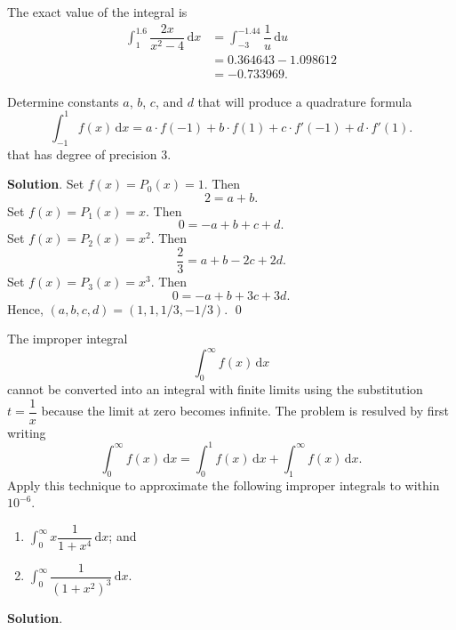 \documentclass[11pt]{article}
\theoremstyle{break}
\newcommand{\ddi}{\text{$\,$d}}
\numberwithin{equation}{theorem}
\begin{document}
The exact value of the integral is \begin{align*}
    \int_{1}^{1.6}\dfrac{2x}{x^2-4}\ddi x&=\int_{-3}^{-1.44}\dfrac{1}{u}\ddi u\\
    &=0.364643-1.098612\\
    &=-0.733969.
\end{align*}


\newpage
\begin{problem}\label{problem 15} %
    Determine constants $a$, $b$, $c$, and $d$ that will produce a quadrature formula $$\int_{-1}^{1}f(x)\ddi x=a\cdot f(-1)+b\cdot f(1)+c\cdot f'(-1)+d\cdot f'(1).$$ that has degree of precision $3$.
\end{problem}
\textbf{Solution}. Set $f(x)=P_0(x)=1$. Then $$2=a+b.$$ Set $f(x)=P_1(x)=x$. Then $$0=-a+b+c+d.$$ Set $f(x)=P_2(x)=x^2$. Then $$\dfrac{2}{3}=a+b-2c+2d.$$ Set $f(x)=P_3(x)=x^3$. Then $$0=-a+b+3c+3d.$$ Hence, $(a, b, c, d)=(1, 1, 1/3, -1/3)$. \qed


\newpage
\begin{problem}\label{problem 16} %
    The improper integral $$\int_{0}^{\infty}f(x)\ddi x$$ cannot be converted into an integral with finite limits using the substitution $t=\dfrac{1}{x}$ because the limit at zero becomes infinite. The problem is resulved by first writing $$\int_{0}^{\infty}f(x)\ddi x=\int_{0}^{1}f(x)\ddi x+\int_{1}^{\infty}f(x)\ddi x.$$ Apply this technique to approximate the following improper integrals to within $10^{-6}$. \vspace{-1em}
    \begin{multicols}{2}
        \begin{enumerate}
            \item $\displaystyle\int_{0}^{\infty}x\dfrac{1}{1+x^4}\ddi x$; and
            \item $\displaystyle\int_{0}^{\infty}\dfrac{1}{(1+x^2)^3}\ddi x$.
        \end{enumerate}
    \end{multicols}
    \vspace{0.1em}
\end{problem}
\textbf{Solution}. 
\end{document}
